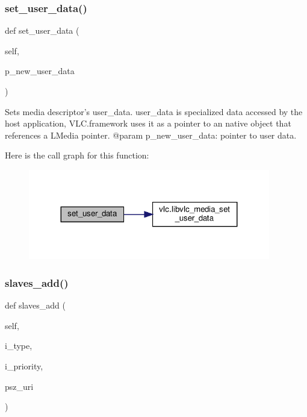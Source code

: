 \subsubsection{\texorpdfstring{set\+\_\+user\+\_\+data()}{set\_user\_data()}}
{\footnotesize\ttfamily def set\+\_\+user\+\_\+data (\begin{DoxyParamCaption}\item[{}]{self,  }\item[{}]{p\+\_\+new\+\_\+user\+\_\+data }\end{DoxyParamCaption})}

\begin{DoxyVerb}Sets media descriptor's user_data. user_data is specialized data
accessed by the host application, VLC.framework uses it as a pointer to
an native object that references a L{Media} pointer.
@param p_new_user_data: pointer to user data.
\end{DoxyVerb}
 Here is the call graph for this function\+:
\nopagebreak
\begin{figure}[H]
\begin{center}
\leavevmode
\includegraphics[width=299pt]{classvlc_1_1_media_a58fa1fb63b70cc0b8efe7a5633afbc74_cgraph}
\end{center}
\end{figure}
\mbox{\label{classvlc_1_1_media_af2aadb97fb0c589f6c40c144679ad927}} 
\subsubsection{\texorpdfstring{slaves\+\_\+add()}{slaves\_add()}}
{\footnotesize\ttfamily def slaves\+\_\+add (\begin{DoxyParamCaption}\item[{}]{self,  }\item[{}]{i\+\_\+type,  }\item[{}]{i\+\_\+priority,  }\item[{}]{psz\+\_\+uri }\end{DoxyParamCaption})}

